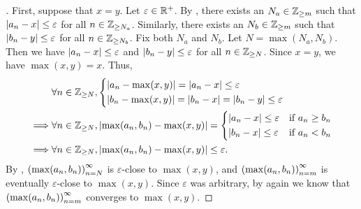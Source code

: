 \begin{proof}[]
  First, suppose that \(x = y\).
  Let \(\varepsilon \in \mathbb{R}^+\).
  By , there exists an \(N_a \in \mathbb{Z}_{\geq m}\) such that \(\left\lvert a_n - x\right\rvert \leq \varepsilon\) for all \(n \in \mathbb{Z}_{\geq N_a}\).
  Similarly, there exists an \(N_b \in \mathbb{Z}_{\geq m}\) such that \(\left\lvert b_n - y\right\rvert \leq \varepsilon\) for all \(n \in \mathbb{Z}_{\geq N_b}\).
  Fix both \(N_a\) and \(N_b\).
  Let \(N = \max(N_a, N_b)\).
  Then we have \(\left\lvert a_n - x\right\rvert \leq \varepsilon\) and \(\left\lvert b_n - y\right\rvert \leq \varepsilon\) for all \(n \in \mathbb{Z}_{\geq N}\).
  Since \(x = y\), we have \(\max(x, y) = x\).
  Thus,
  \begin{align*}
             & \forall n \in \mathbb{Z}_{\geq N}, \begin{dcases}
                                            \left\lvert a_n - \max(x, y)\right\rvert = \left\lvert a_n - x\right\rvert \leq \varepsilon \\
                                            \left\lvert b_n - \max(x, y)\right\rvert = \left\lvert b_n - x\right\rvert = \left\lvert b_n - y\right\rvert \leq \varepsilon
                                          \end{dcases}                       \\
    \implies & \forall n \in \mathbb{Z}_{\geq N}, \left\lvert\max(a_n, b_n) - \max(x, y)\right\rvert = \begin{dcases}
                                                                                \left\lvert a_n - x\right\rvert \leq \varepsilon & \text{if } a_n \geq b_n \\
                                                                                \left\lvert b_n - x\right\rvert \leq \varepsilon & \text{if } a_n < b_n
                                                                              \end{dcases} \\
    \implies & \forall n \in \mathbb{Z}_{\geq N}, \left\lvert\max(a_n, b_n) - \max(x, y)\right\rvert \leq \varepsilon.
  \end{align*}
  By , \(\left\lparen\max(a_n, b_n)\right\rparen_{n = N}^\infty\) is \(\varepsilon\)-close to \(\max(x, y)\), and \(\left\lparen\max(a_n, b_n)\right\rparen_{n = m}^\infty\) is eventually \(\varepsilon\)-close to \(\max(x, y)\).
  Since \(\varepsilon\) was arbitrary, by  again we know that \(\left\lparen\max(a_n, b_n)\right\rparen_{n = m}^\infty\) converges to \(\max(x, y)\).


\end{proof}
